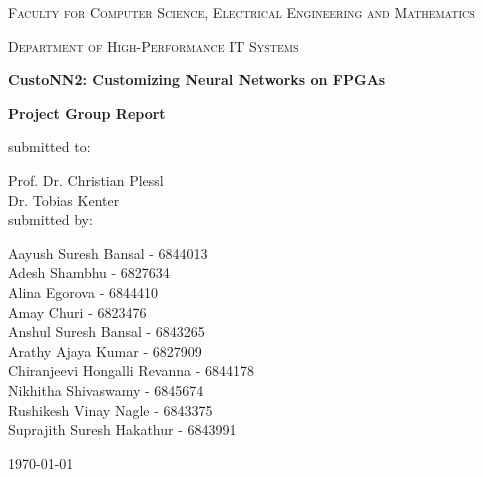 \documentclass[a4paper,12pt,bibliography=totoc,listof=totoc]{scrreprt}
\begin{document}
\pagestyle{empty}

\begin{titlepage}
	\centering

	\begin{figure}%
		\qquad
	\end{figure}
	{\scshape Faculty for Computer Science, Electrical Engineering and Mathematics \par}
	{\scshape Department of High-Performance IT Systems \par}
	
	\vspace{1cm}
	{\Large\bfseries CustoNN2: Customizing Neural Networks on FPGAs\par}
	\vspace{1cm}
	{\large \textbf{Project Group Report }\par}
	\vspace{1cm}
	{\large submitted to:}\par
	{\large Prof. Dr. Christian Plessl } \\
	{\large Dr. Tobias Kenter }\\
	\vspace{1.5cm}
	submitted by:\par
	{\large Aayush Suresh Bansal - 6844013 } \\
	{\large Adesh Shambhu - 6827634} \\
	{\large Alina Egorova - 6844410} \\
	{\large Amay Churi - 6823476} \\
	{\large Anshul Suresh Bansal - 6843265 } \\
	{\large Arathy Ajaya Kumar - 6827909} \\
	{\large Chiranjeevi Hongalli Revanna - 6844178 } \\
	{\large Nikhitha Shivaswamy - 6845674 } \\
	{\large Rushikesh Vinay Nagle - 6843375 } \\
	{\large Suprajith Suresh Hakathur - 6843991 } \\
        \vspace*{\fill}
	{\today\par}
\end{titlepage}
\end{document}
